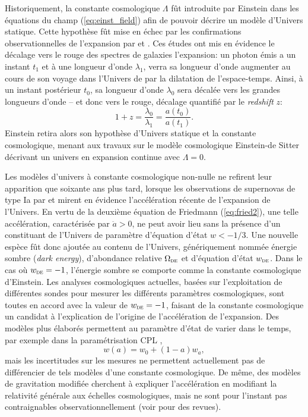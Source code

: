 Historiquement, la constante cosmologique $\Lambda$ fût introduite par Einstein dans les équations du champ (\ref{eq:einst_field}) afin de pouvoir décrire un modèle d'Univers statique.
Cette hypothèse fût mise en échec par les confirmations observationnelles de l'expansion par  et .
Ces études ont mis en évidence le décalage vers le rouge des spectres de galaxies l'expansion: un photon émis a un instant $t_1$ et à une longueur d'onde $\lambda_1$, verra sa longueur d'onde augmenter au cours de son voyage dans l'Univers de par la dilatation de l'espace-temps.
Ainsi, à un instant postérieur $t_0$, sa longueur d'onde $\lambda_0$ sera décalée vers les grandes longueurs d'onde -- et donc vers le rouge, décalage quantifié par le \textit{redshift} $z$:
\begin{equation}
    \label{eq:redshift}
    1 + z = \frac{\lambda_0}{\lambda_1} = \frac{a(t_0)}{a(t_1)}.
\end{equation}
Einstein retira alors son hypothèse d'Univers statique et la constante cosmologique, menant aux travaux sur le modèle cosmologique Einstein-de Sitter \cite{einstein_relation_1932} décrivant un univers en expansion continue avec $\Lambda = 0$.

Les modèles d'univers à constante cosmologique non-nulle ne refirent leur apparition que soixante ans plus tard, lorsque les observations de supernovas de type Ia par  et  mirent en évidence l'accélération récente de l'expansion de l'Univers.
En vertu de la deuxième équation de Friedmann (\ref{eq:fried2}), une telle accélération, caractérisée par $\ddot{a} > 0$, ne peut avoir lieu sans la présence d'un constituant de l'Univers de paramètre d'équation d'état $w < -1/3$.
Une nouvelle espèce fût donc ajoutée au contenu de l'Univers, génériquement nommée énergie sombre (\textit{dark energy}), d'abondance relative $\Omega_\textsc{de}$ et d'équation d'état $w_\textsc{de}$.
Dans le cas où $w_\textsc{de} = -1$, l'énergie sombre se comporte comme la constante cosmologique d'Einstein.
Les analyses cosmologiques actuelles, basées sur l'exploitation de différentes sondes pour mesurer les différents paramètres cosmologiques, sont toutes en accord avec la valeur de $w_\textsc{de} = -1$, faisant de la constante cosmologique un candidat à l'explication de l'origine de l'accélération de l'expansion.
Des modèles plus élaborés permettent au paramètre d'état de varier dans le temps, par exemple dans la paramétrisation CPL \cite{chevallier_accelerating_2001,linder_exploring_2003},
\begin{equation}
    \label{eq:de_cpl}
    w(a) = w_0 + (1-a) w_a,
\end{equation}
mais les incertitudes sur les mesures ne permettent actuellement pas de différencier de tels modèles d'une constante cosmologique.
De même, des modèles de gravitation modifiée cherchent à expliquer l'accélération en modifiant la relativité générale aux échelles cosmologiques, mais ne sont pour l'instant pas contraignables observationnellement (voir \cite{clifton_modified_2012,tamosiunas_testing_2020} pour des revues).

